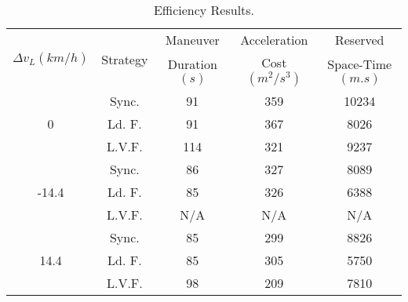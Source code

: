 \begin{table}[!h]
\caption{Efficiency Results. \label{tab:efficiency_results}}
\centering
\begin{tabular}{c | c | c | c | c }
\multirow{2}{*}{$\Delta v_L (km/h)$} & \multirow{2}{*}{Strategy} & Maneuver  & Acceleration & Reserved\\
& & Duration $(s)$ & Cost $(m^2/s^3)$ & Space-Time $(m.s)$\\ \hline \hline   & Sync. & 91 & 359 & 10234 \\ \cline{2-5} 
 0 & Ld. F. & 91 & 367 & 8026 \\ \cline{2-5} 
  & L.V.F. & 114 & 321 & 9237 \\ \hline \hline 
  & Sync. & 86 & 327 & 8089 \\ \cline{2-5} 
 -14.4 & Ld. F. & 85 & 326 & 6388 \\ \cline{2-5} 
  & L.V.F. & N/A & N/A & N/A \\ \hline \hline 
  & Sync. & 85 & 299 & 8826 \\ \cline{2-5} 
 14.4 & Ld. F. & 85 & 305 & 5750 \\ \cline{2-5} 
  & L.V.F. & 98 & 209 & 7810 \\  
 \end{tabular} 
\end{table}